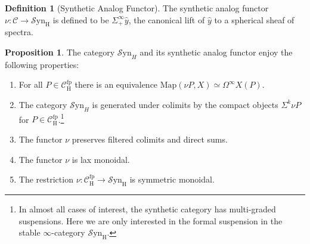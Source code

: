 \documentclass[10pt]{amsart}
\theoremstyle{definition}
\numberwithin{figure}{section}
\numberwithin{equation}{section}
\newtheorem{proposition}[figure]{Proposition}
\newtheorem{definition}[figure]{Definition}
\newcommand{\cC}{\mathcal{C}}
\theoremstyle{cited}
\newcommand{\Map}{\mathrm{Map}}
\newcommand{\fp}{\mathrm{fp}}
\newcommand{\Syn}{\mathcal{S}\mathrm{yn}}
\renewcommand{\H}{\mathrm{H}}
\begin{document}
\begin{definition}[Synthetic Analog Functor]\label{def:synanalog}
  The synthetic analog functor $\nu:\cC\to \Syn_\H$ is defined to be $\Sigma_+^\infty \hat y$, the canonical lift of $\hat y$ to a spherical sheaf of spectra.
\end{definition}

\begin{proposition}\label{prop:analogprops}
   The category $\Syn_H$ and its synthetic analog functor enjoy the following properties:
   \begin{enumerate}
    \item For all $P\in \cC_\H^\fp$ there is an equivalence $\Map(\nu P, X)\simeq \Omega^\infty X(P)$.
    \item The category $\Syn_H$ is generated under colimits by the compact objects $\Sigma^{k}\nu P$ for $P\in \cC_\H^\fp$.\footnote{In almost all cases of interest, the synthetic category has multi-graded suspensions. Here we are only interested in the formal suspension in the stable $\infty$-category $\Syn_\H$.}
    \item The functor $\nu$ preserves filtered colimits and direct sums.
    \item The functor $\nu$ is lax monoidal.
    \item The restriction $\nu:\cC_\H^\fp\to \Syn_\H$ is symmetric monoidal.
   \end{enumerate}  
\end{proposition}
\end{document}

